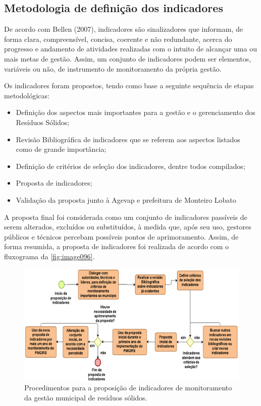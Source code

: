\subsection{Metodologia de definição dos indicadores}
De acordo com Bellen (2007), indicadores são sinalizadores que informam, de forma clara, compreensível, concisa, coerente e não redundante, acerca do progresso e andamento de atividades realizadas com o intuito de alcançar uma ou mais metas de gestão. Assim, um conjunto de indicadores podem ser elementos, variáveis ou não, de instrumento de monitoramento da própria gestão.

Os indicadores foram propostos, tendo como base a seguinte sequência de etapas metodológicas:

\begin{itemize}
	\item Definição dos aspectos mais importantes para a gestão e o
	gerenciamento dos Resíduos Sólidos;
	\item Revisão Bibliográfica de indicadores que se referem aos aspectos
	listados como de grande importância;
	\item Definição de critérios de seleção dos indicadores, dentre todos
	compilados;
	\item Proposta de indicadores;
	\item Validação da proposta junto à Agevap e prefeitura de Monteiro
	Lobato
\end{itemize} 

A proposta final foi considerada como um conjunto de indicadores passíveis de serem alterados, excluídos ou substituídos, à medida que, após seu uso, gestores públicos e técnicos percebam possíveis pontos de aprimoramento. Assim, de forma resumida, a proposta de indicadores foi realizada de acordo com o fluxograma da \autoref{fig:image096}.

\begin{figure}
	\centering
	\includegraphics[width=0.75\linewidth]{produtos/prodtres/image096}
	\caption{Procedimentos para a proposição de indicadores de monitoramento da gestão municipal de resíduos sólidos.}
	\label{fig:image096}
\end{figure}


